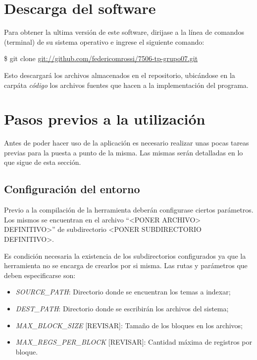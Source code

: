 \documentclass{article}
\begin{document}
\section{Descarga del software}

	Para obtener la ultima versión de este software, dirijase a la línea de comandos (terminal) de su sistema operativo e ingrese el siguiente comando:
	\bigskip

	\colorbox{gray95}{{\ttfamily\footnotesize
	\$ git clone \url{git://github.com/federicomrossi/7506-tp-grupo07.git}\\}}
	\bigskip

	Esto descargará los archivos almacenados en el repositorio, ubicándose en la carpáta \textit{código} los archivos fuentes que hacen a la implementación del programa.
\bigskip\medskip




\section{Pasos previos a la utilización}

	Antes de poder hacer uso de la aplicación es necesario realizar unas pocas tareas previas para la puesta a punto de la misma. Las mismas serán detalladas en lo que sigue de esta sección.
	\bigskip



\subsection{Configuración del entorno}

	Previo a la compilación de la herramienta deberán configurase ciertos parámetros. Los mismos se encuentran en el archivo “<PONER ARCHIVO> DEFINITIVO>” de subdirectorio <PONER SUBDIRECTORIO DEFINITIVO>.
	\par
	Es condición necesaria la existencia de los subdirectorios configurados ya que la herramienta no se encarga de crearlos por si misma. Las rutas y parámetros que deben especificarse son:
	\medskip


\begin{itemize}
\itemsep=5pt \topsep=0pt \partopsep=0pt \parskip=0pt \parsep=0pt

	\item \textit{SOURCE\_PATH}: Directorio donde se encuentran los temas a indexar;

	\item \textit{DEST\_PATH}: Directorio donde se escribirán los archivos del sistema;

	\item \textit{MAX\_BLOCK\_SIZE} [REVISAR]: Tamaño de los bloques en los archivos;

	\item \textit{MAX\_REGS\_PER\_BLOCK} [REVISAR]: Cantidad máxima de registros por bloque.

\end{itemize}
\bigskip
\end{document}
